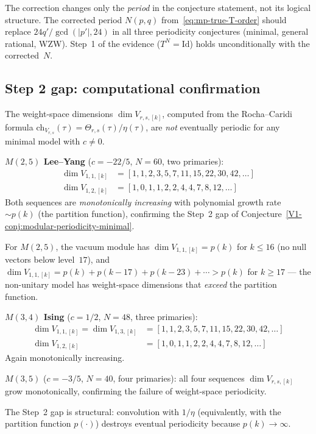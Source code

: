 \documentclass[11pt]{article}
\begin{document}
\begin{remark}
The correction changes only the \emph{period} in the
conjecture statement, not its logical structure.
The corrected period $N(p,q)$ from~\eqref{eq:mp-true-T-order}
should replace $24q'/\gcd(|p'|,24)$ in all three periodicity
conjectures (minimal, general rational, WZW).
Step~1 of the evidence ($T^N = \mathrm{Id}$) holds
unconditionally with the corrected~$N$.
\end{remark}

\subsection{Step 2 gap: computational confirmation}
\label{subsec:mp-step2}

\begin{computation}
\label{comp:weight-space-non-periodicity}
The weight-space dimensions $\dim V_{r,s,[k]}$, computed from the
Rocha--Caridi formula
$\mathrm{ch}_{V_{r,s}}(\tau) = \Theta_{r,s}(\tau)/\eta(\tau)$,
are \emph{not} eventually periodic for any minimal model with
$c \ne 0$.

\smallskip\noindent
\textbf{$M(2,5)$ Lee--Yang} ($c = -22/5$, $N = 60$, two primaries):
\begin{align*}
\dim V_{1,1,[k]} &= [1, 1, 2, 3, 5, 7, 11, 15, 22, 30, 42, \ldots] \\
\dim V_{1,2,[k]} &= [1, 0, 1, 1, 2, 2, 4, 4, 7, 8, 12, \ldots]
\end{align*}
Both sequences are \emph{monotonically increasing} with polynomial
growth rate $\sim p(k)$ (the partition function), confirming the
Step~2 gap of Conjecture~\ref*{V1-conj:modular-periodicity-minimal}.

For $M(2,5)$, the vacuum module has
$\dim V_{1,1,[k]} = p(k)$ for $k \le 16$
(no null vectors below level~$17$), and
$\dim V_{1,1,[k]} = p(k) + p(k-17) + p(k-23) + \cdots > p(k)$
for $k \ge 17$ --- the non-unitary model has weight-space
dimensions that \emph{exceed} the partition function.

\smallskip\noindent
\textbf{$M(3,4)$ Ising} ($c = 1/2$, $N = 48$, three primaries):
\begin{align*}
\dim V_{1,1,[k]} = \dim V_{1,3,[k]} &=
  [1, 1, 2, 3, 5, 7, 11, 15, 22, 30, 42, \ldots] \\
\dim V_{1,2,[k]} &= [1, 0, 1, 1, 2, 2, 4, 4, 7, 8, 12, \ldots]
\end{align*}
Again monotonically increasing.

\smallskip\noindent
\textbf{$M(3,5)$} ($c = -3/5$, $N = 40$, four primaries):
all four sequences $\dim V_{r,s,[k]}$ grow monotonically,
confirming the failure of weight-space periodicity.

The Step~2 gap is structural: convolution with $1/\eta$
(equivalently, with the partition function $p(\cdot)$)
destroys eventual periodicity because $p(k) \to \infty$.
\end{computation}
\end{document}
